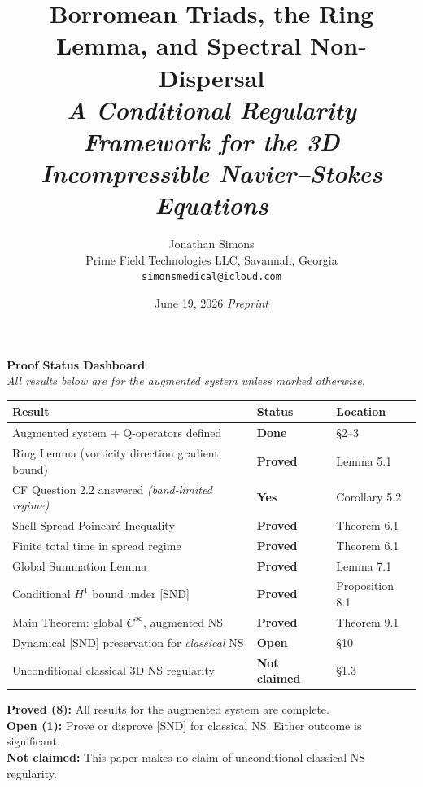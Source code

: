 \documentclass[11pt]{article}
\title{\textbf{Borromean Triads, the Ring Lemma, and Spectral Non-Dispersal}\\[6pt]
\large\textit{A Conditional Regularity Framework for the 3D Incompressible Navier--Stokes Equations}}
\author{Jonathan Simons\\
Prime Field Technologies LLC, Savannah, Georgia\\
\texttt{simonsmedical@icloud.com}}
\date{June 19, 2026 \quad\textit{Preprint}}
\begin{document}
\maketitle

\begin{mdframed}[
  linecolor=darkblue, linewidth=1.5pt, backgroundcolor=white,
  innertopmargin=10pt, innerbottommargin=10pt,
  innerleftmargin=12pt, innerrightmargin=12pt
]
{\large\textbf{\color{darkblue} Proof Status Dashboard}}\\[6pt]
{\small\textit{All results below are for the augmented system unless marked otherwise.}}\\[8pt]
\begin{tabular}{>{\raggedright\arraybackslash}p{7.8cm} >{\centering\arraybackslash}p{2.5cm} >{\raggedright\arraybackslash}p{3.5cm}}
\toprule
\textbf{Result} & \textbf{Status} & \textbf{Location} \\
\midrule
\rowcolor{lightgreen}
Augmented system + Q-operators defined & \textcolor{proved}{\textbf{Done}} & \S2--3 \\
\rowcolor{lightgreen}
Ring Lemma (vorticity direction gradient bound) & \textcolor{proved}{\textbf{Proved}} & Lemma 5.1 \\
\rowcolor{lightgreen}
CF Question 2.2 answered \emph{(band-limited regime)} & \textcolor{proved}{\textbf{Yes}} & Corollary 5.2 \\
\rowcolor{lightgreen}
Shell-Spread Poincar\'e Inequality & \textcolor{proved}{\textbf{Proved}} & Theorem 6.1 \\
\rowcolor{lightgreen}
Finite total time in spread regime & \textcolor{proved}{\textbf{Proved}} & Theorem 6.1 \\
\rowcolor{lightgreen}
Global Summation Lemma & \textcolor{proved}{\textbf{Proved}} & Lemma 7.1 \\
\rowcolor{lightgreen}
Conditional $H^1$ bound under [SND] & \textcolor{proved}{\textbf{Proved}} & Proposition 8.1 \\
\rowcolor{lightgreen}
Main Theorem: global $C^\infty$, augmented NS & \textcolor{proved}{\textbf{Proved}} & Theorem 9.1 \\
\midrule
\rowcolor{lightred}
Dynamical [SND] preservation for \emph{classical} NS & \textcolor{open}{\textbf{Open}} & \S10 \\
\rowcolor{lightgray}
Unconditional classical 3D NS regularity & \textcolor{notclaimed}{\textbf{Not claimed}} & \S1.3 \\
\bottomrule
\end{tabular}
\vspace{8pt}
{\small
\textbf{\color{proved}Proved (8):} All results for the augmented system are complete.\\[4pt]
\textbf{\color{open}Open (1):} Prove or disprove [SND] for classical NS. Either outcome is significant.\\[4pt]
\textbf{\color{notclaimed}Not claimed:} This paper makes no claim of unconditional classical NS regularity.
}
\end{mdframed}
\end{document}
